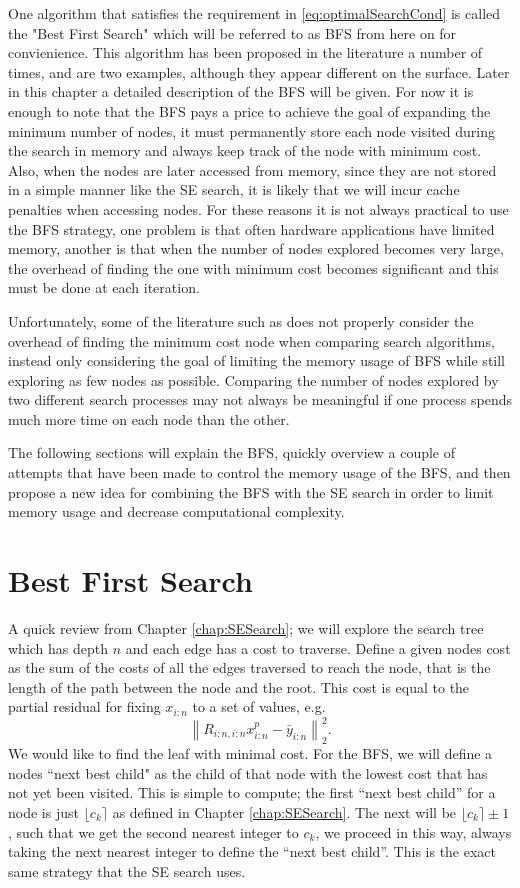 \documentclass[12pt,Bold,letterpaper]{mcgilletdclass}
\newcommand{\vsp}{\vspace{\baselineskip}}
\begin{document}
One algorithm that satisfies the requirement in \eqref{eq:optimalSearchCond} is called the "Best First Search" which will be referred to as BFS from here on for convienience. This algorithm has been proposed in the literature a number of times, \cite{FukMU04} and \cite{XuWZW04} are two examples, although they appear different on the surface. Later in this chapter a detailed description of the BFS will be given. For now it is enough to note that the BFS pays a price to achieve the goal of expanding the minimum number of nodes, it must permanently store each node visited during the search in memory and always keep track of the node with minimum cost. Also, when the nodes are later accessed from memory, since they are not stored in a simple manner like the SE search, it is likely that we will incur cache penalties when accessing nodes. For these reasons it is not always practical to use the BFS strategy, one problem is that often hardware applications have limited memory, another is that when the number of nodes explored becomes very large, the overhead of finding the one with minimum cost becomes significant and this must be done at each iteration.

Unfortunately, some of the literature such as \cite{StuBF07} does not properly consider the overhead of finding the minimum cost node when comparing search algorithms, instead only considering the goal of limiting the memory usage of BFS while still exploring as few nodes as possible. Comparing the number of nodes explored by two different search processes may not always be meaningful if one process spends much more time on each node than the other.

The following sections will explain the BFS, quickly overview a couple of attempts that have been made to control the memory usage of the BFS, and then propose a new idea for combining the BFS with the SE search in order to limit memory usage and decrease computational complexity.

\vsp \section{Best First Search} \label{sec:BFS}

A quick review from Chapter \ref{chap:SESearch}; we will explore the search tree which has depth $n$ and each edge has a cost to traverse. Define a given nodes cost as the sum of the costs of all the edges traversed to reach the node, that is the length of the path between the node and the root. This cost is equal to the partial residual for fixing $x_{i:n}$ to a set of values, e.g. $$\left \| R_{i:n,i:n}x_{i:n}^p - \bar{y}_{i:n}\right \|_2^2.$$ We would like to find the leaf with minimal cost. For the BFS, we will define a nodes ``next best child" as the child of that node with the lowest cost that has not yet been visited. This is simple to compute; the first ``next best child'' for a node is just $\lfloor c_k \rceil$ as defined in Chapter \ref{chap:SESearch}. The next will be $\lfloor c_k \rceil \pm 1$, such that we get the second nearest integer to $c_k$, we proceed in this way, always taking the next nearest integer to define the ``next best child''. This is the exact same strategy that the SE search uses.
\end{document}

